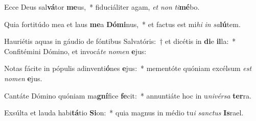 \item Ecce Deus sal\textbf{vá}tor \textbf{me}us,~* fiduciáliter agam, \textit{et} \textit{non} \textit{ti}\textbf{mé}bo.
\item Quia fortitúdo mea et laus \textbf{me}a \textbf{Dó}\textbf{mi}nus,~* et factus est mi\textit{hi} \textit{in} \textit{sa}\textbf{lú}tem.
\item Hauriétis aquas in gáudio de fóntibus Salvatóris:~† et dicétis in \textbf{di}e \textbf{il}la:~* Confitémini Dómino, et invocá\textit{te} \textit{no}\textit{men} \textbf{e}jus:
\item Notas fácite in pópulis adinventi\textbf{ó}nes \textbf{e}jus:~* mementóte quóniam excélsum \textit{est} \textit{no}\textit{men} \textbf{e}jus.
\item Cantáte Dómino quóniam ma\textbf{gní}fice \textbf{fe}cit:~* annuntiáte hoc in u\textit{ni}\textit{vér}\textit{sa} \textbf{ter}ra.
\item Exsúlta et lauda habi\textbf{tá}tio \textbf{Si}on:~* quia magnus in médio tu\textit{i} \textit{sanc}\textit{tus} \textbf{Is}rael.
